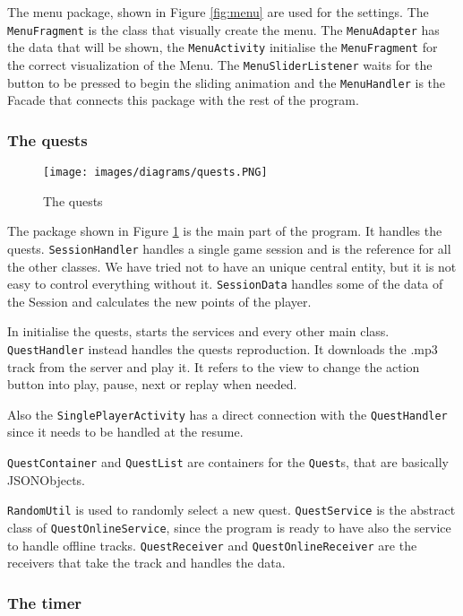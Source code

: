 The menu package, shown in Figure \ref{fig:menu} are used for the settings. The \texttt{MenuFragment} is the class that visually create the menu. The \texttt{MenuAdapter} has the data that will be shown, the \texttt{MenuActivity} initialise the \texttt{MenuFragment} for the correct visualization of the Menu. The \texttt{MenuSliderListener} waits for the button to be pressed to begin the sliding animation and the \texttt{MenuHandler} is the Facade that connects this package with the rest of the program.

\subsubsection{The quests}

\begin{figure}[H]
\centering %
\texttt{[image: images/diagrams/quests.PNG]}
\caption{The quests}
\label{fig:quests}
\end{figure}

The package shown in Figure \ref{fig:quests} is the main part of the program. It handles the quests. \texttt{SessionHandler} handles a single game session and is the reference for all the other classes. We have tried not to have an unique central entity, but it is not easy to control everything without it. \texttt{SessionData} handles some of the data of the Session and calculates the new points of the player.

In initialise the quests, starts the services and every other main class. \texttt{QuestHandler} instead handles the quests reproduction. It downloads the .mp3 track from the server and play it. It refers to the view to change the action button into play, pause, next or replay when needed.

Also the \texttt{SinglePlayerActivity} has a direct connection with the \texttt{QuestHandler} since it needs to be handled at the resume.

\texttt{QuestContainer} and \texttt{QuestList} are containers for the \texttt{Quest}s, that are basically JSONObjects.

\texttt{RandomUtil} is used to randomly select a new quest. \texttt{QuestService} is the abstract class of \texttt{QuestOnlineService}, since the program is ready to have also the service to handle offline tracks. \texttt{QuestReceiver} and \texttt{QuestOnlineReceiver} are the receivers that take the track and handles the data.


\subsubsection{The timer}

